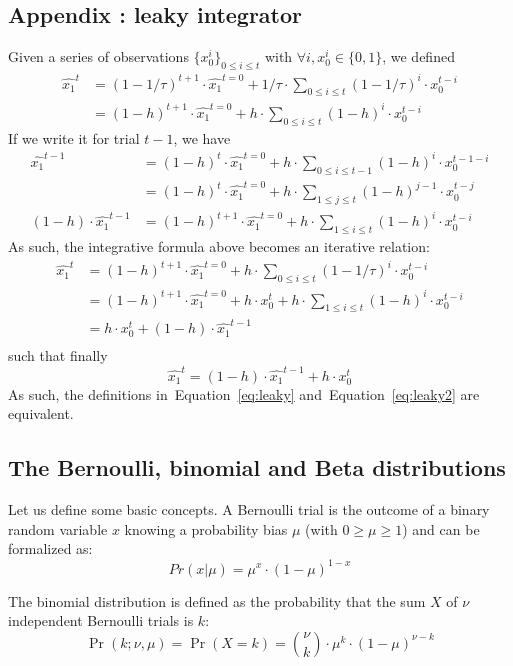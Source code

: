 \documentclass[12pt,english]{article}%
\newcommand{\eq}[1]{\begin{equation*}#1\end{equation*}}
\newcommand{\eqs}[1]{\begin{align*}#1\end{align*}}
\newcommand{\seeEq}[1]{Equation~\ref{eq:#1}}
\begin{document}
\subsection{Appendix : leaky integrator}
\label{app:leaky}
Given a series of observations $\{x_0^i\}_{0\leq i \leq t}$
with $\forall i, x_0^i \in \{0, 1 \}$, we defined
\eqs{
\hat{x_1}^{t} &= (1-1/\tau)^{t+1} \cdot \hat{x_1}^{t=0} + 1/\tau \cdot \sum_{0\leq i \leq t} (1 - 1/\tau)^{i} \cdot x_0^{t-i}\\
			  &= (1-h)^{t+1} \cdot \hat{x_1}^{t=0} + h \cdot \sum_{0\leq i \leq t} (1 - h)^{i} \cdot x_0^{t-i}
}
If we write it for trial $t-1$, we have
\eqs{
\hat{x_1}^{t-1}	&= (1-h)^{t} \cdot \hat{x_1}^{t=0} + h \cdot \sum_{0\leq i \leq t-1} (1 - h)^{i} \cdot x_0^{t-1-i} \\
                &= (1-h)^{t} \cdot \hat{x_1}^{t=0} + h \cdot \sum_{1\leq j \leq t} (1 - h)^{j-1} \cdot x_0^{t-j} \\ %
(1 - h) \cdot \hat{x_1}^{t-1} &= (1-h)^{t+1} \cdot \hat{x_1}^{t=0} +  h \cdot \sum_{1\leq i \leq t} (1 - h)^{i} \cdot x_0^{t-i}
                }
As such, the integrative formula above becomes an iterative relation:
\eqs{
\hat{x_1}^{t}	&= (1-h)^{t+1} \cdot \hat{x_1}^{t=0} + h \cdot \sum_{0\leq i \leq t} (1 - 1/\tau)^{i} \cdot x_0^{t-i} \\
				&= (1-h)^{t+1} \cdot \hat{x_1}^{t=0} + h \cdot x_0^{t} + h \cdot \sum_{1\leq i \leq t} (1 - h)^{i} \cdot x_0^{t-i} \\
				&= h \cdot x_0^{t} + (1 - h) \cdot \hat{x_1}^{t-1} \\
}
such that finally
\eq{
\hat{x_1}^{t} = (1 - h) \cdot \hat{x_1}^{t-1} + h \cdot x_0^t
}
As such, the definitions in~\seeEq{leaky} and~\seeEq{leaky2} are equivalent.


\subsection{The Bernoulli, binomial and Beta distributions}

Let us define some basic concepts. A Bernoulli trial is the outcome of a binary random variable $x$ knowing a probability bias $\mu$ (with $0 \geq \mu \geq 1$) and can be formalized as:
\eq{
Pr(x | \mu) = \mu^x \cdot (1-\mu)^{1-x}
}

The binomial distribution is defined as the probability that the sum $X$ of $\nu$ independent Bernoulli trials is $k$:
\eq{
\Pr(k;\nu,\mu) = \Pr(X = k) = {\nu\choose k} \cdot \mu^k \cdot (1-\mu)^{\nu-k}
}
\end{document}

